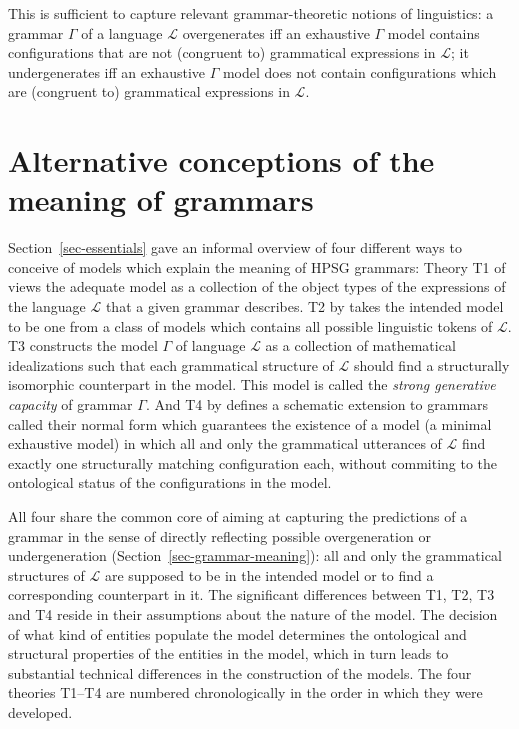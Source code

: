\documentclass[output=paper,biblatex,babelshorthands,newtxmath,draftmode,colorlinks,citecolor=brown]{langscibook}
\begin{document}
{This is sufficient to capture relevant grammar-theoretic notions of
linguistics: a grammar $\Gamma$ of a language $\mathcal{L}$
overgenerates iff an exhaustive $\Gamma$ model contains configurations
that are not (congruent to) grammatical expressions in $\mathcal{L}$;
it undergenerates iff an exhaustive $\Gamma$ model does not contain
configurations which are (congruent to) grammatical expressions in
$\mathcal{L}$.




\section{Alternative conceptions of the meaning of grammars}
\label{sec-alt-gr-meaning}

Section~\ref{sec-essentials} gave an informal overview of four
different ways to conceive of models which explain the meaning of HPSG
grammars: Theory T1 of  views the adequate model
as a collection of the object types of the expressions of the language
$\mathcal{L}$ that a given grammar describes. T2 by \citet{King99a-u}
takes the intended model to be one from a class of models which contains
all possible linguistic tokens of $\mathcal{L}$.  T3
\citep{Pollard99a} constructs the model $\Gamma$ of language $\mathcal{L}$ as a
collection of mathematical idealizations such that each grammatical
structure of $\mathcal{L}$ should find a structurally isomorphic
counterpart in the model. This model is called the \emph{strong generative
capacity} of grammar $\Gamma$. And T4 by \citet{Richter2007a} defines a
schematic extension to grammars called their normal form which
guarantees the existence of a model (a minimal exhaustive model) in
which all and only the grammatical utterances of $\mathcal{L}$ find
exactly one structurally matching configuration each, without
commiting to the ontological status of the configurations in the
model.

\largerpage
All four share the common core of aiming at capturing the predictions
of a grammar in the sense of directly reflecting possible
overgeneration or undergeneration (Section~\ref{sec-grammar-meaning}):
all and only the grammatical structures of $\mathcal{L}$ are supposed
to be in the intended model or to find a corresponding counterpart in
it. The significant differences between T1, T2, T3 and T4 reside in
their assumptions about the nature of the model. The decision of what
kind of entities populate the model determines the ontological and
structural properties of the entities in the model, which in turn leads
to substantial technical differences in the construction of the
models.
The four theories T1--T4 are numbered chronologically in the order in
which they were developed.

}
\end{document}
